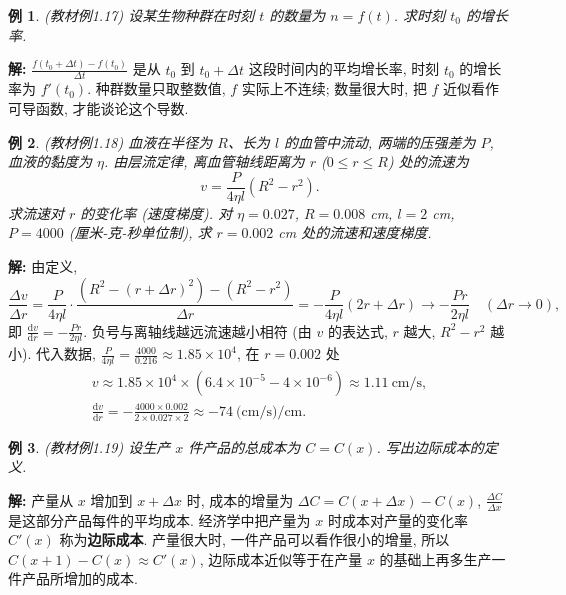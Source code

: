 \documentclass[UTF8,openany]{ctexbook}
\theoremstyle{chinesetextbook}
\newtheorem{example}{例}[section]
\newenvironment{cnsolution}{\par\indent\textbf{解:} \ignorespaces}{\par}
\newcommand{\dd}{\mathrm d}
\begin{document}
\begin{example}\label{ex:c2-1-17}
\textnormal{(教材例1.17)} 设某生物种群在时刻 $t$ 的数量为 $n=f(t)$. 求时刻 $t_0$ 的增长率.
\end{example}
\begin{cnsolution}
$\displaystyle\frac{f(t_0+\Delta t)-f(t_0)}{\Delta t}$ 是从 $t_0$ 到 $t_0+\Delta t$ 这段时间内的平均增长率, 时刻 $t_0$ 的增长率为 $f'(t_0)$. 种群数量只取整数值, $f$ 实际上不连续; 数量很大时, 把 $f$ 近似看作可导函数, 才能谈论这个导数.
\end{cnsolution}
\begin{example}\label{ex:c2-1-18}
\textnormal{(教材例1.18)} 血液在半径为 $R$、长为 $l$ 的血管中流动, 两端的压强差为 $P$, 血液的黏度为 $\eta$. 由层流定律, 离血管轴线距离为 $r$ ($0\le r\le R$) 处的流速为
\[
v=\frac P{4\eta l}\left(R^2-r^2\right).
\]
求流速对 $r$ 的变化率 (速度梯度). 对 $\eta=0.027$, $R=0.008$ cm, $l=2$ cm, $P=4000$ (厘米-克-秒单位制), 求 $r=0.002$ cm 处的流速和速度梯度.
\end{example}
\begin{cnsolution}
由定义,
\[
\frac{\Delta v}{\Delta r}=\frac P{4\eta l}\cdot\frac{\left(R^2-(r+\Delta r)^2\right)-\left(R^2-r^2\right)}{\Delta r}=-\frac P{4\eta l}(2r+\Delta r)\to-\frac{Pr}{2\eta l}\quad(\Delta r\to0),
\]
即 $\displaystyle\frac{\dd v}{\dd r}=-\frac{Pr}{2\eta l}$. 负号与离轴线越远流速越小相符 (由 $v$ 的表达式, $r$ 越大, $R^2-r^2$ 越小). 代入数据, $\displaystyle\frac P{4\eta l}=\frac{4000}{0.216}\approx1.85\times10^4$, 在 $r=0.002$ 处
\[
\begin{gathered}
v\approx1.85\times10^4\times\left(6.4\times10^{-5}-4\times10^{-6}\right)\approx1.11\ \text{cm/s},\\
\frac{\dd v}{\dd r}=-\frac{4000\times0.002}{2\times0.027\times2}\approx-74\ \text{(cm/s)/cm}.
\end{gathered}
\]
\end{cnsolution}
\begin{example}\label{ex:c2-1-19}
\textnormal{(教材例1.19)} 设生产 $x$ 件产品的总成本为 $C=C(x)$. 写出边际成本的定义.
\end{example}
\begin{cnsolution}
产量从 $x$ 增加到 $x+\Delta x$ 时, 成本的增量为 $\Delta C=C(x+\Delta x)-C(x)$, $\displaystyle\frac{\Delta C}{\Delta x}$ 是这部分产品每件的平均成本. 经济学中把产量为 $x$ 时成本对产量的变化率 $C'(x)$ 称为\textbf{边际成本}. 产量很大时, 一件产品可以看作很小的增量, 所以 $C(x+1)-C(x)\approx C'(x)$, 边际成本近似等于在产量 $x$ 的基础上再多生产一件产品所增加的成本.
\end{cnsolution}
\end{document}
